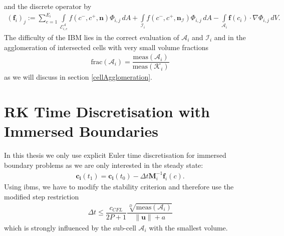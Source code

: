 	and the discrete operator by
	\begin{align}
		(\mathbf{f}_i)_j := \sum_{e=1}^{E_i}\int\limits_{\mathcal{E}_{i,e}^\mathcal{A}} f \left( c^-, c^+, \mathbf{n} \right) \Phi_{i,j} \, dA + \int\limits_{\mathcal{I}_{i}} f \left( c^-, c^+, \mathbf{n}_\mathcal{I} \right) \Phi_{i,j} \, dA - \int\limits_{\mathcal{A}_i} \boldsymbol{f}\left(c_i\right) \cdot \nabla\Phi_{i,j} \, dV.
	\end{align}
	The difficulty of the IBM lies in the correct evaluation of $\mathcal{A}_i$ and $\mathcal{I}_i$ and in the agglomeration of intersected cells with very small volume fractions 
	\begin{align}
		\text{frac}(\mathcal{A}_i) = \dfrac{\text{meas}(\mathcal{A}_i)}{\text{meas}(\mathcal{K}_i)}
	\end{align} 
	as we will discuss in section \cref{cellAgglomeration}.
	
	\section{RK Time Discretisation with Immersed Boundaries}
	In this thesis we only use explicit Euler time discretisation for immersed boundary problems as we are only interested in the steady state:
	\begin{align}
		\mathbf{c_i}(t_1) = \mathbf{c_i}(t_0)-\Delta t \mathbf{M}_i^{-1} \mathbf{f}_i (c).
	\end{align}
	Using \gls{ibm}s, we have to modify the stability criterion and therefore use the modified step restriction
	\begin{align}
		\Delta t \leq \dfrac{c_{CFL}}{2P+1} \dfrac{\sqrt[D]{\text{meas}(\mathcal{A}_i)}}{\|\mathbf{u} \| + a}
		\label{timestepIBM}
	\end{align}
	which is strongly influenced by the sub-cell $\mathcal{A}_i$ with the smallest volume.
	
